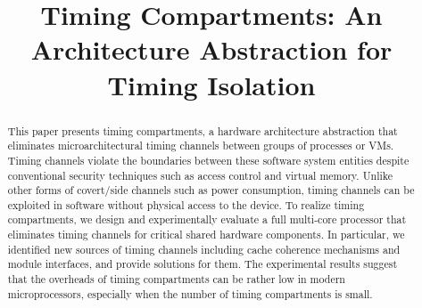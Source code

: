 \title{
    Timing Compartments: An Architecture Abstraction for Timing Isolation
}



\date{}
\maketitle

\thispagestyle{empty}

\begin{abstract}
    This paper presents timing compartments, a hardware architecture 
    abstraction
    that eliminates microarchitectural timing channels between groups of 
    processes or VMs. Timing channels violate the boundaries between these 
    software system entities despite conventional security techniques such as 
    access control and virtual memory. Unlike other forms of covert/side channels such 
    as power consumption, timing channels can be exploited in software without 
    physical access to the device. 
    To realize timing 
    compartments, we design and experimentally evaluate a full multi-core 
    processor that eliminates timing channels for critical shared hardware 
    components. 
    In particular, we identified new sources of timing channels including
    cache coherence mechanisms and module interfaces, and provide solutions for them.
    The experimental results suggest that the overheads of
    timing compartments can be rather low in modern microprocessors, especially 
    when the number of timing compartments is small.

\end{abstract}
